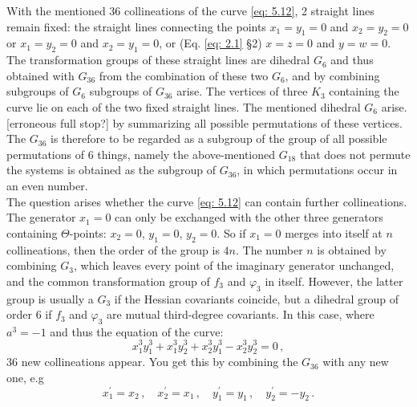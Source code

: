 \documentclass[leqno]{article}
\begin{document}
With the mentioned 36 collineations of the curve \eqref{eq: 5.12}, 2 straight lines remain fixed: the straight lines connecting the points $x_1 = y_1 = 0$ and $x_2 = y_2 = 0$ or $x_1 = y_2 = 0$ and $x_2 = y_1 = 0$, or (Eq. \eqref{eq: 2.1} \S 2) $x=z=0$ and $y=w=0$. The transformation groups of these straight lines are dihedral $G_6$ and thus obtained with $G_{36}$ from the combination of these two $G_6$, and by combining subgroups of $G_6$ subgroups of $G_{36}$ arise. The vertices of three $K_3$ containing the curve lie on each of the two fixed straight lines. The mentioned dihedral $G_6$ arise. [erroneous full stop?] by summarizing all possible permutations of these vertices. The $G_{36}$ is therefore to be regarded as a subgroup of the group of all possible permutations of 6 things, namely the above-mentioned $G_{18}$ that does not permute the systems is obtained as the subgroup of $G_{36}$, in which permutations occur in an even number. \\
The question arises whether the curve \eqref{eq: 5.12} can contain further collineations. The generator $x_1=0$ can only be exchanged with the other three generators containing $\Theta$-points: $x_2=0$, $y_1=0$, $y_2=0$. So if $x_1=0$ merges into itself at $n$ collineations, then the order of the group is $4n$. The number $n$ is obtained by combining $G_3$, which leaves every point of the imaginary generator unchanged, and the common transformation group of $f_3$ and $\varphi_3$ in itself. However, the latter group is usually a $G_3$ if the Hessian covariants coincide, but a dihedral group of order 6 if $f_3$ and $\varphi_3$ are mutual third-degree covariants. In this case, where $a^3=-1$ and thus the equation of the curve: 
\begin{equation}\label{eq: 5.13}
x_1^3 y_1^3 + x_1^3 y_2^3 + x_2^3 y_1^3 - x_2^3 y_2^3 = 0 \, , \tag{13}
\end{equation} 36 new collineations appear. You get this by combining the $G_{36}$ with any new one, e.g
\[
x_1^\prime = x_2 \, , \quad x_2^\prime = x_1 \, , \quad y_1^\prime = y_1 \, , \quad y_2^\prime = - y_2 \, . 
\]
\end{document}
